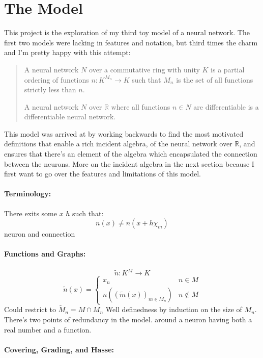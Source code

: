 
\chapter{The Model}
This project is the exploration of my third toy model of a neural network.
The first two models were lacking in features and notation,
but third times the charm and I'm pretty happy with this attempt:
\begin{quote}
A neural network $N$ over a commutative ring with unity $K$ is a partial ordering of functions $n:K^{M_n}\rightarrow K$ such that $M_n$ is the set of all functions strictly less than $n$.

A neural network $N$ over $\mathbb{R}$ where all functions $n\in N$ are differentiable is a differentiable neural network.
\end{quote}
This model was arrived at by working backwards to find the most motivated definitions that enable a rich incident algebra,
of the neural network over $\mathbb{R}$,
and ensures that there's an element of the algebra which encapsulated the connection between the neurons.
More on the incident algebra in the next section because I first want to go over the features and limitations of this model.

\subsubsection{Terminology:}
There exits some $x$ $h$ such that:
\[n(x)\neq n(x+h\chi_m)\]
neuron and connection

\subsubsection{Functions and Graphs:}
\[\tilde{n}:K^M\rightarrow K\]
\[
	\tilde{n}(x) = \begin{cases} x_n & n\in M\\ n((\tilde{m}(x))_{m\in M_n}) & n\notin M\end{cases}
\]
Could restrict to $\tilde{M}_n = M\cap M_n$
Well definedness by induction on the size of $M_n$.
There's two points of redundancy in the model.
around a neuron having both a real number and a function.

\subsubsection{Covering, Grading, and Hasse:}
\begin{center}
\quad
{}
\end{center}

